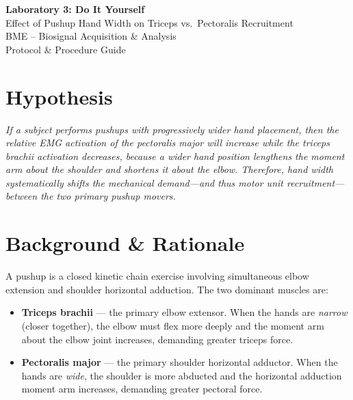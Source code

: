 \documentclass[11pt,letterpaper]{article}
\begin{document}
\begin{center}
{\LARGE \textbf{Laboratory 3: Do It Yourself}} \\[6pt]
{\Large Effect of Pushup Hand Width on Triceps vs.\ Pectoralis Recruitment} \\[10pt]
{\normalsize BME -- Biosignal Acquisition \& Analysis} \\[4pt]
{\normalsize Protocol \& Procedure Guide}
\end{center}
\vspace{0.5cm}

\section{Hypothesis}

\textit{If a subject performs pushups with progressively wider hand placement, then the relative EMG activation of the pectoralis major will increase while the triceps brachii activation decreases, because a wider hand position lengthens the moment arm about the shoulder and shortens it about the elbow.  Therefore, hand width systematically shifts the mechanical demand---and thus motor unit recruitment---between the two primary pushup movers.}

\section{Background \& Rationale}

A pushup is a closed kinetic chain exercise involving simultaneous elbow extension and shoulder horizontal adduction.  The two dominant muscles are:

\begin{itemize}[nosep]
    \item \textbf{Triceps brachii} --- the primary elbow extensor.  When the hands are \emph{narrow} (closer together), the elbow must flex more deeply and the moment arm about the elbow joint increases, demanding greater triceps force.
    \item \textbf{Pectoralis major} --- the primary shoulder horizontal adductor.  When the hands are \emph{wide}, the shoulder is more abducted and the horizontal adduction moment arm increases, demanding greater pectoral force.
\end{itemize}
\end{document}
